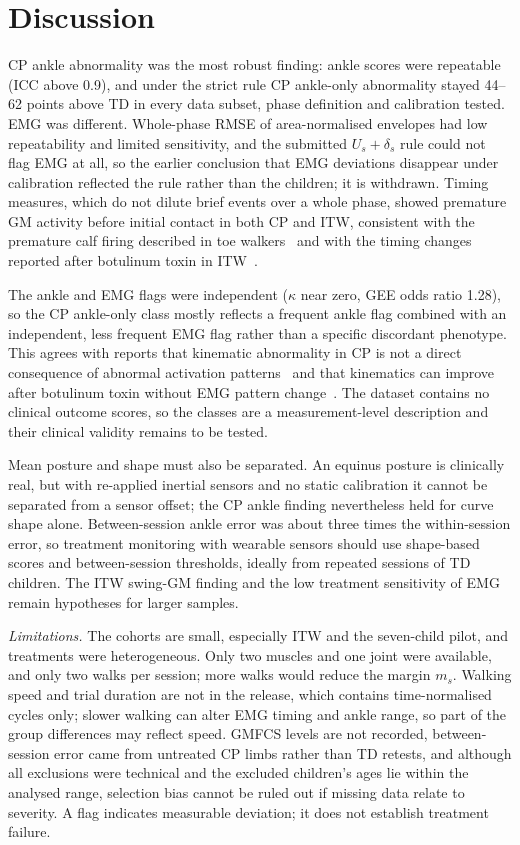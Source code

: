 \documentclass[conference]{IEEEtran}
\newcommand{\rone}[1]{{\color{rI}#1}}
\newcommand{\rtwo}[1]{{\color{rII}#1}}
\newcommand{\rthree}[1]{{\color{rIII}#1}}
\newcommand{\rfour}[1]{{\color{rIV}#1}}
\newcommand{\rone}[1]{#1}
\newcommand{\rtwo}[1]{#1}
\newcommand{\rthree}[1]{#1}
\newcommand{\rfour}[1]{#1}
\begin{document}
\section{Discussion}
CP ankle abnormality was the most robust finding: ankle scores were repeatable (ICC above 0.9), and under the strict rule CP ankle-only abnormality stayed 44--62 points above TD in every data subset, phase definition and calibration tested. \rtwo{EMG was different. Whole-phase RMSE of area-normalised envelopes had low repeatability and limited sensitivity, and the submitted $U_s+\delta_s$ rule could not flag EMG at all, so the earlier conclusion that EMG deviations disappear under calibration reflected the rule rather than the children; it is withdrawn.} \rthree{Timing measures, which do not dilute brief events over a whole phase, showed premature GM activity before initial contact in both CP and ITW, consistent with the premature calf firing described in toe walkers~\cite{policy2001itw} and with the timing changes reported after botulinum toxin in ITW~\cite{brunt2004itw}.}

\rtwo{The ankle and EMG flags were independent ($\kappa$ near zero, GEE odds ratio 1.28), so the CP ankle-only class mostly reflects a frequent ankle flag combined with an independent, less frequent EMG flag rather than a specific discordant phenotype.} This agrees with reports that kinematic abnormality in CP is not a direct consequence of abnormal activation patterns~\cite{syczewska2016emg} and that kinematics can improve after botulinum toxin without EMG pattern change~\cite{vanderhouwen2011btx}. \rone{The dataset contains no clinical outcome scores, so the classes are a measurement-level description and their clinical validity remains to be tested.}

\rone{Mean posture and shape must also be separated. An equinus posture is clinically real, but with re-applied inertial sensors and no static calibration it cannot be separated from a sensor offset; the CP ankle finding nevertheless held for curve shape alone.} \rthree{Between-session ankle error was about three times the within-session error, so treatment monitoring with wearable sensors should use shape-based scores and between-session thresholds, ideally from repeated sessions of TD children.} \rtwo{The ITW swing-GM finding and the low treatment sensitivity of EMG remain hypotheses for larger samples.}

\textit{Limitations.} \rone{The cohorts are small, especially ITW and the seven-child pilot, and treatments were heterogeneous.} Only two muscles and one joint were available, \rone{and only two walks per session; more walks would reduce the margin $m_s$.} \rfour{Walking speed and trial duration are not in the release, which contains time-normalised cycles only; slower walking can alter EMG timing and ankle range, so part of the group differences may reflect speed.} \rtwo{GMFCS levels are not recorded,} \rthree{between-session error came from untreated CP limbs rather than TD retests,} \rfour{and although all exclusions were technical and the excluded children's ages lie within the analysed range, selection bias cannot be ruled out if missing data relate to severity.} A flag indicates measurable deviation; it does not establish treatment failure.
\end{document}
